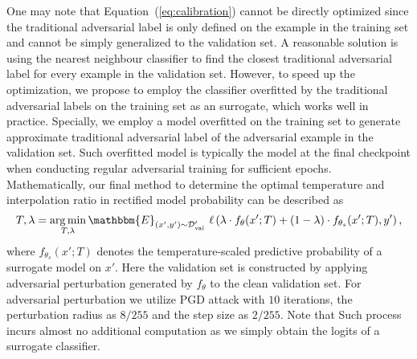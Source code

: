 One may note that Equation~(\ref{eq:calibration}) cannot be directly optimized since the traditional adversarial label is only defined on the example in the training set and cannot be simply generalized to the validation set.
A reasonable solution is using the nearest neighbour classifier to find the closest traditional adversarial label for every example in the validation set. 
However, to speed up the optimization, we propose to employ the classifier overfitted by the traditional adversarial labels on the training set as an surrogate, which works well in practice.
Specially, we employ a model overfitted on the training set to generate approximate traditional adversarial label of the adversarial example in the validation set. Such overfitted model is typically the model at the final checkpoint when conducting regular adversarial training for sufficient epochs. Mathematically, our final method to determine the optimal temperature and interpolation ratio in rectified model probability can be described as
\begin{equation}
    T, \lambda = \argmin_{T, \lambda} \mathbbm{E}_{(x', y')\sim \mathcal{D}'_\text{val}}~\ell\left(\lambda\cdot f_\theta(x'; T) + (1-\lambda)\cdot f_{\theta_s}(x'; T), y'\right),
\end{equation}
where $f_{\theta_s}(x'; T)$ denotes the temperature-scaled predictive probability of a surrogate model on $x'$. Here the validation set is constructed by applying adversarial perturbation generated by $f_\theta$ to the clean validation set. For adversarial perturbation we utilize PGD attack with $10$ iterations, the perturbation radius as $8/255$ and the step size as $2/255$.
Note that Such process incurs almost no additional computation as we simply obtain the logits of a surrogate classifier. %


